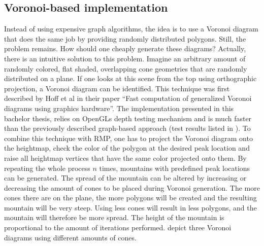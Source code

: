 \documentclass[11pt,a4paper,twoside,openright]{report}
\begin{document}
\subsection{Voronoi-based implementation}
\label{subsec:voronoibasedimpl}
Instead of using expensive graph algorithms, the idea is to use a Voronoi diagram that does the same job by providing randomly distributed polygons. Still, the problem remains. How should one cheaply generate these diagrams? Actually, there is an intuitive solution to this problem. Imagine an arbitrary amount of randomly colored, flat shaded, overlapping cone geometries that are randomly distributed on a plane. If one looks at this scene from the top using orthographic projection, a Voronoi diagram can be identified. This technique was first described by Hoff et al in their paper \cite{hoff1999fast} ``Fast computation of generalized Voronoi diagrams using graphics hardware''. The implementation presented in this bachelor thesis, relies on OpenGLs depth testing mechanism and is much faster than the previously described graph-based approach (test results listed in ). To combine this technique with RMP, one has to project the Voronoi diagram onto the heightmap, check the color of the polygon at the desired peak location and raise all heightmap vertices that have the same color projected onto them. By repeating the whole process $n$ times, mountains with predefined peak locations can be generated. The spread of the mountain can be altered by increasing or decreasing the amount of cones to be placed during Voronoi generation. The more cones there are on the plane, the more polygons will be created and the resulting mountain will be very steep. Using less cones will result in less polygons, and the mountain will therefore be more spread. The height of the mountain is proportional to the amount of iterations performed.  depict three Voronoi diagrams using different amounts of cones.
\end{document}

